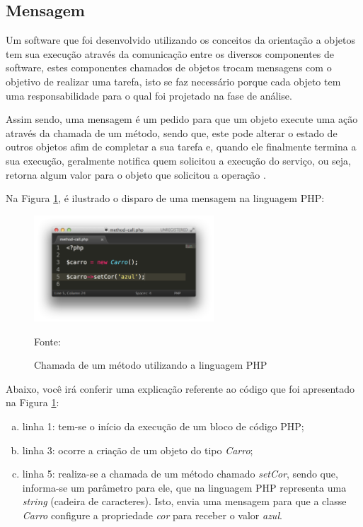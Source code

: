 \subsection{Mensagem}

Um software que foi desenvolvido utilizando os conceitos da orientação a
objetos tem sua execução através da comunicação entre os diversos componentes
de software, estes componentes chamados de objetos trocam mensagens com o
objetivo de realizar uma tarefa, isto se faz necessário porque cada objeto  tem
uma responsabilidade para o qual foi projetado na fase de análise.

Assim sendo, uma mensagem é um pedido para que um objeto execute uma ação
através da chamada de um método, sendo que, este pode alterar o estado de
outros objetos afim de completar a sua tarefa e, quando ele finalmente termina
a sua execução, geralmente notifica quem solicitou a execução do serviço, ou
seja, retorna algum valor para o objeto que solicitou a operação
\cite{c++ComoProgramar}.

Na Figura \ref{fig:mensagem}, é ilustrado o disparo de uma mensagem na linguagem
\acs{PHP}:

\begin{figure}[h!tb]
	\caption{Chamada de um método utilizando a linguagem PHP}
	\label{fig:mensagem}

	\centering
	\includegraphics[width=0.6\textwidth]{images/method-call.png}

	\centering
	\footnotesize Fonte: \fonteOAutor
\end{figure}

\FloatBarrier 	%

Abaixo, você irá conferir uma explicação referente ao código que foi
apresentado na Figura \ref{fig:mensagem}:

\begin{enumerate}[a)]
    \item linha 1: tem-se o início da execução de um bloco de código
    \acs{PHP};
    \item linha 3: ocorre a criação de um objeto do tipo \textit{Carro};
    \item linha 5: realiza-se a chamada de um método chamado
    \textit{setCor}, sendo que, informa-se um parâmetro para ele, que na
    linguagem \acs{PHP} representa uma \textit{string} (cadeira de caracteres).
    Isto, envia uma mensagem para que a classe \textit{Carro} configure
    a propriedade \textit{cor} para receber o valor \textit{azul}.
\end{enumerate}

